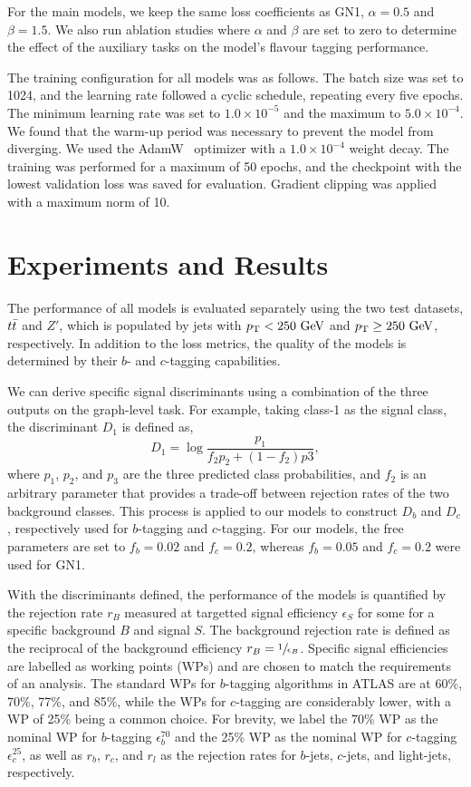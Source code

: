For the main models, we keep the same loss coefficients as GN1, $\alpha = 0.5$ and $\beta = 1.5$.
We also run ablation studies where $\alpha$ and $\beta$ are set to zero to determine the effect of the auxiliary tasks on the model's flavour tagging performance.

The training configuration for all models was as follows.
The batch size was set to 1024, and the learning rate followed a cyclic schedule, repeating every five epochs.
The minimum learning rate was set to $1.0 \times 10^{-5}$ and the maximum to $5.0 \times 10^{-4}$.
We found that the warm-up period was necessary to prevent the model from diverging.
We used the AdamW~\cite{AdamW} optimizer with a $1.0 \times 10^{-4}$ weight decay.
The training was performed for a maximum of 50 epochs, and the checkpoint with the lowest validation loss was saved for evaluation.
Gradient clipping was applied with a maximum norm of 10.

\section{Experiments and Results}
\newcommand{\bnom}{\epsilon_b^{70}}
\newcommand{\cnom}{\epsilon_c^{25}}

The performance of all models is evaluated separately using the two test datasets, $t\bar{t}$ and $Z'$, which is populated by jets with $\pt < 250~\GeV$ and $\pt \geq 250~\GeV$, respectively.
In addition to the loss metrics, the quality of the models is determined by their $b$- and $c$-tagging capabilities.

We can derive specific signal discriminants using a combination of the three outputs on the graph-level task.
For example, taking class-1 as the signal class, the discriminant $D_1$ is defined as,
\begin{equation}
    D_1 = \log\frac{p_1}{f_2 p_2 + (1-f_2)p3},
\end{equation}
where $p_1$, $p_2$, and $p_3$ are the three predicted class probabilities, and $f_2$ is an arbitrary parameter that provides a trade-off between rejection rates of the two background classes.
This process is applied to our models to construct $D_b$ and $D_c$, respectively used for $b$-tagging and $c$-tagging.
For our models, the free parameters are set to $f_b=0.02$ and $f_c=0.2$, whereas $f_b=0.05$ and $f_c=0.2$ were used for GN1.

With the discriminants defined, the performance of the models is quantified by the rejection rate $r_B$ measured at targetted signal efficiency $\epsilon_S$ for some for a specific background $B$ and signal $S$.
The background rejection rate is defined as the reciprocal of the background efficiency $r_B = \sfrac{1}{\epsilon_B}$.
Specific signal efficiencies are labelled as working points (WPs) and are chosen to match the requirements of an analysis.
The standard WPs for $b$-tagging algorithms in ATLAS are at 60\%, 70\%, 77\%, and 85\%, while the WPs for $c$-tagging are considerably lower, with a WP of 25\% being a common choice.
For brevity, we label the 70\% WP as the nominal WP for $b$-tagging $\bnom$ and the 25\% WP as the nominal WP for $c$-tagging $\cnom$, as well as $r_b$, $r_c$, and $r_l$ as the rejection rates for $b$-jets, $c$-jets, and light-jets, respectively.


